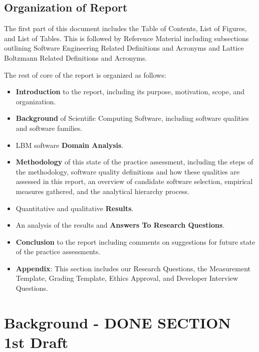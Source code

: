 \documentclass[12pt, notitlepage]{article}
\begin{document}
\subsection{Organization of Report}

The first part of this document includes the Table of Contents, List of Figures, and List of Tables. This is followed by Reference Material including subsections outlining Software Engineering Related Definitions and Acronyms and Lattice Boltzmann Related Definitions and Acronyms.

The rest of core of the report is organized as follows:

\begin{itemize}
	\item \textbf{Introduction} to the report, including its purpose, motivation, scope, and organization.
	\item \textbf{Background} of Scientific Computing Software, including software qualities and software families.
	\item LBM software \textbf{Domain Analysis}.
	\item \textbf{Methodology} of this state of the practice assessment, including the steps of the methodology, software quality definitions and how these qualities are assessed in this report, an overview of candidate software selection, empirical measures gathered, and the analytical hierarchy process. 
	\item Quantitative and qualitative \textbf{Results}. 
	\item An analysis of the results and \textbf{Answers To Research Questions}.
	\item \textbf{Conclusion} to the report including comments on suggestions for future state of the practice assessments.
	\item \textbf{Appendix}: This section includes our Research Questions, the Measurement Template, Grading Template, Ethics Approval, and Developer Interview Questions.
\end{itemize}

\newpage
\section{Background - DONE SECTION 1st Draft}
\end{document}
